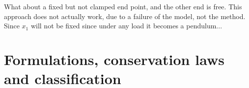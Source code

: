 \documentclass{X:/Documents/Coding/Latex/myassignment}
\begin{document}
What about a fixed but not clamped end point, and the other end is free. This approach does not actually work, due to a failure of the model, not the method. Since $x_1$ will not be fixed since under any load it becomes a pendulum...






\section{Formulations, conservation laws and classification}
\end{document}
